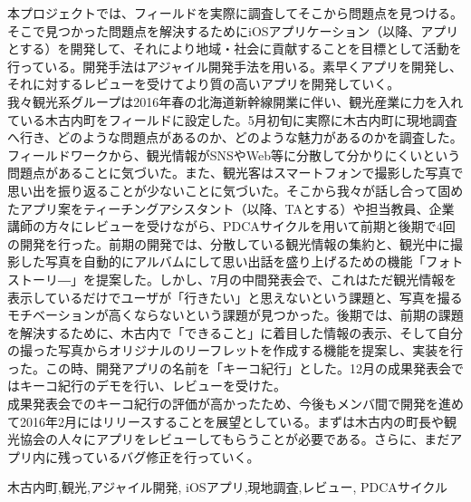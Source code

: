 \begin{jabstract}
\quad 本プロジェクトでは、フィールドを実際に調査してそこから問題点を見つける。そこで見つかった問題点を解決するためにiOSアプリケーション（以降、アプリとする）を開発して、それにより地域・社会に貢献することを目標として活動を行っている。開発手法はアジャイル開発手法を用いる。素早くアプリを開発し、それに対するレビューを受けてより質の高いアプリを開発していく。\\
\quad 我々観光系グループは2016年春の北海道新幹線開業に伴い、観光産業に力を入れている木古内町をフィールドに設定した。5月初旬に実際に木古内町に現地調査へ行き、どのような問題点があるのか、どのような魅力があるのかを調査した。フィールドワークから、観光情報がSNSやWeb等に分散して分かりにくいという問題点があることに気づいた。また、観光客はスマートフォンで撮影した写真で思い出を振り返ることが少ないことに気づいた。そこから我々が話し合って固めたアプリ案をティーチングアシスタント（以降、TAとする）や担当教員、企業講師の方々にレビューを受けながら、PDCAサイクルを用いて前期と後期で4回の開発を行った。前期の開発では、分散している観光情報の集約と、観光中に撮影した写真を自動的にアルバムにして思い出話を盛り上げるための機能「フォトストーリ―」を提案した。しかし、7月の中間発表会で、これはただ観光情報を表示しているだけでユーザが「行きたい」と思えないという課題と、写真を撮るモチベーションが高くならないという課題が見つかった。後期では、前期の課題を解決するために、木古内で「できること」に着目した情報の表示、そして自分の撮った写真からオリジナルのリーフレットを作成する機能を提案し、実装を行った。この時、開発アプリの名前を「キーコ紀行」とした。12月の成果発表会ではキーコ紀行のデモを行い、レビューを受けた。\\
\quad 成果発表会でのキーコ紀行の評価が高かったため、今後もメンバ間で開発を進めて2016年2月にはリリースすることを展望としている。まずは木古内の町長や観光協会の人々にアプリをレビューしてもらうことが必要である。さらに、まだアプリ内に残っているバグ修正を行っていく。\\

\begin{jkeyword}
木古内町,観光,アジャイル開発, iOSアプリ,現地調査,レビュー, PDCAサイクル
\end{jkeyword}
\end{jabstract}

